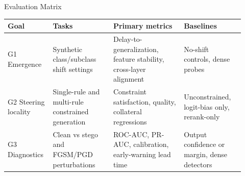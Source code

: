 \begin{frame}{Evaluation Matrix}
    \tiny
    \begin{table}
        \centering
        \setlength{\tabcolsep}{2pt}
        \begin{tabular}{@{}p{0.15\linewidth}p{0.24\linewidth}p{0.29\linewidth}p{0.24\linewidth}@{}}
            \toprule
            \textbf{Goal} & \textbf{Tasks} & \textbf{Primary metrics} & \textbf{Baselines} \\
            \midrule
            G1 Emergence &
            Synthetic class/subclass shift settings &
            Delay-to-generalization, feature stability, cross-layer alignment &
            No-shift controls, dense probes \\
            \addlinespace[0.25em]
            G2 Steering locality &
            Single-rule and multi-rule constrained generation &
            Constraint satisfaction, quality, collateral regressions &
            Unconstrained, logit-bias only, rerank-only \\
            \addlinespace[0.25em]
            G3 Diagnostics &
            Clean vs stego and FGSM/PGD perturbations &
            ROC-AUC, PR-AUC, calibration, early-warning lead time &
            Output confidence or margin, dense detectors \\
            \bottomrule
        \end{tabular}
        \setlength{\tabcolsep}{6pt}
    \end{table}
\end{frame}
